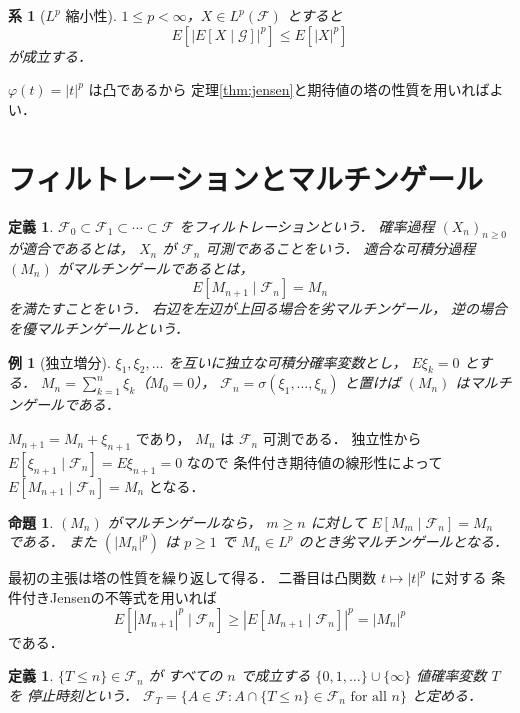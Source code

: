 \documentclass[a5paper,10pt,onecolumn]{jsarticle}
\makeatletter
\theoremstyle{mathnotetheorem}
\newtheorem{definition}[theorem]{定義}
\newtheorem{proposition}[theorem]{命題}
\newtheorem{corollary}[theorem]{系}
\newtheorem{example}[theorem]{例}
\renewcommand{\proofname}{証明}
\renewenvironment{proof}[1][\proofname]{%
  \par\pushQED{\qed}\normalfont\topsep4\p@\@plus2\p@\relax
  \trivlist\item[\hskip\labelsep\bfseries #1]\ignorespaces
}{\popQED\endtrivlist\@endpefalse}
\makeatother
\begin{document}
\begin{corollary}[$L^p$ 縮小性]\label{cor:lp}
$1\le p<\infty$，$X\in L^p(\mathcal F)$ とすると
\[
 E[|E[X\mid\mathcal G]|^p]\le E[|X|^p]
\]
が成立する．
\end{corollary}
\begin{proof}
$\varphi(t)=|t|^p$ は凸であるから
定理\ref{thm:jensen}と期待値の塔の性質を用いればよい．
\end{proof}

\section{フィルトレーションとマルチンゲール}

\begin{definition}
$\mathcal F_0\subset\mathcal F_1\subset\cdots\subset\mathcal F$
をフィルトレーションという．
確率過程 $(X_n)_{n\ge0}$ が適合であるとは，
$X_n$ が $\mathcal F_n$ 可測であることをいう．
適合な可積分過程 $(M_n)$ が\emph{マルチンゲール}であるとは，
\[
 E[M_{n+1}\mid\mathcal F_n]=M_n
\]
を満たすことをいう．
右辺を左辺が上回る場合を劣マルチンゲール，
逆の場合を優マルチンゲールという．
\end{definition}

\begin{example}[独立増分]
$\xi_1,\xi_2,\ldots$ を互いに独立な可積分確率変数とし，
$E\xi_k=0$ とする．
$M_n=\sum_{k=1}^n\xi_k$（$M_0=0$），
$\mathcal F_n=\sigma(\xi_1,\dots,\xi_n)$ と置けば
$(M_n)$ はマルチンゲールである．
\end{example}
\begin{proof}
$M_{n+1}=M_n+\xi_{n+1}$ であり，
$M_n$ は $\mathcal F_n$ 可測である．
独立性から
$E[\xi_{n+1}\mid\mathcal F_n]=E\xi_{n+1}=0$ なので
条件付き期待値の線形性によって
$E[M_{n+1}\mid\mathcal F_n]=M_n$ となる．
\end{proof}

\begin{proposition}\label{prop:martingale-time}
$(M_n)$ がマルチンゲールなら，
$m\ge n$ に対して
$E[M_m\mid\mathcal F_n]=M_n$ である．
また $(|M_n|^p)$ は $p\ge1$ で
$M_n\in L^p$ のとき劣マルチンゲールとなる．
\end{proposition}
\begin{proof}
最初の主張は塔の性質を繰り返して得る．
二番目は凸関数 $t\mapsto|t|^p$ に対する
条件付きJensenの不等式を用いれば
\[
 E[|M_{n+1}|^p\mid\mathcal F_n]
 \ge|E[M_{n+1}\mid\mathcal F_n]|^p=|M_n|^p
\]
である．
\end{proof}

\begin{definition}
$\{T\le n\}\in\mathcal F_n$ が
すべての $n$ で成立する
$\{0,1,\dots\}\cup\{\infty\}$ 値確率変数 $T$ を
停止時刻という．
$\mathcal F_T=\{A\in\mathcal F:
 A\cap\{T\le n\}\in\mathcal F_n\text{ for all }n\}$
と定める．
\end{definition}
\end{document}
